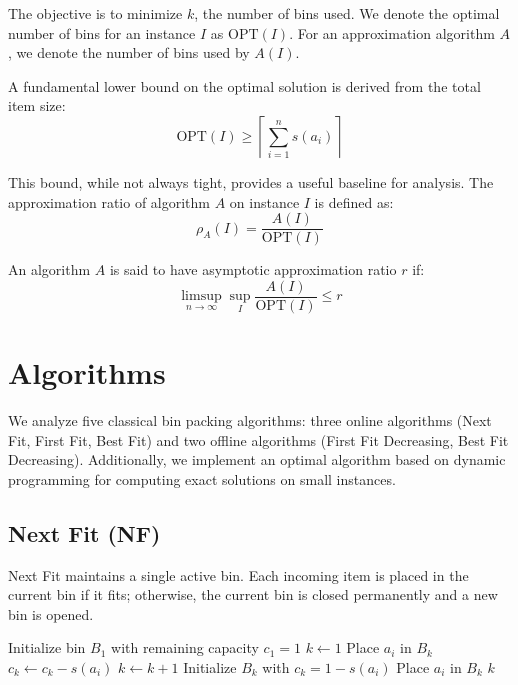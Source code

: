 \documentclass[11pt,a4paper]{article}
\begin{document}
The objective is to minimize $k$, the number of bins used. We denote the optimal number of bins for an instance $I$ as $\text{OPT}(I)$. For an approximation algorithm $A$, we denote the number of bins used by $A(I)$.

A fundamental lower bound on the optimal solution is derived from the total item size:
\begin{equation}
\text{OPT}(I) \geq \left\lceil \sum_{i=1}^{n} s(a_i) \right\rceil
\end{equation}

This bound, while not always tight, provides a useful baseline for analysis. The approximation ratio of algorithm $A$ on instance $I$ is defined as:
\begin{equation}
\rho_A(I) = \frac{A(I)}{\text{OPT}(I)}
\end{equation}

An algorithm $A$ is said to have asymptotic approximation ratio $r$ if:
\begin{equation}
\limsup_{n \to \infty} \sup_I \frac{A(I)}{\text{OPT}(I)} \leq r
\end{equation}

\section{Algorithms}

We analyze five classical bin packing algorithms: three online algorithms (Next Fit, First Fit, Best Fit) and two offline algorithms (First Fit Decreasing, Best Fit Decreasing). Additionally, we implement an optimal algorithm based on dynamic programming for computing exact solutions on small instances.

\subsection{Next Fit (NF)}

Next Fit maintains a single active bin. Each incoming item is placed in the current bin if it fits; otherwise, the current bin is closed permanently and a new bin is opened.

\begin{algorithm}[H]
\caption{Next Fit}
\begin{algorithmic}[1]
\STATE Initialize bin $B_1$ with remaining capacity $c_1 = 1$
\STATE $k \gets 1$ 
        \STATE Place $a_i$ in $B_k$
        \STATE $c_k \gets c_k - s(a_i)$
    \ELSE
        \STATE $k \gets k + 1$
        \STATE Initialize $B_k$ with $c_k = 1 - s(a_i)$
        \STATE Place $a_i$ in $B_k$
    \ENDIF
\ENDFOR
\RETURN $k$
\end{algorithmic}
\end{algorithm}
\end{document}
